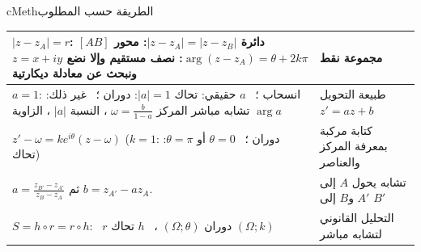 \documentclass[12pt,a4paper]{article}
\newenvironment{BOX}[2]{\begin{otherlanguage}{english}\begin{arbox}{#1}{#2}}{\end{arbox}\end{otherlanguage}}
\begin{document}
\begin{BOX}{cMeth}{الطريقة حسب المطلوب}
\begin{center}
\begin{tabular}{|p{}|p{}|}
$|z-z_A|=r$: دائرة \newline $|z-z_A|=|z-z_B|$: محور $[AB]$ \newline $\arg(z-z_A)=\theta+2k\pi$: نصف مستقيم \newline وإلا نضع $z=x+iy$ ونبحث عن معادلة ديكارتية & مجموعة نقط\\\hline
$a=1$: انسحاب ؛ \ $a$ حقيقي: تحاك \newline $|a|=1$: دوران ؛ \ غير ذلك: تشابه مباشر \newline المركز $\omega=\frac{b}{1-a}$ ، النسبة $|a|$ ، الزاوية $\arg a$ & طبيعة التحويل $z'=az+b$\\\hline
$z'-\omega=ke^{i\theta}(z-\omega)$ \newline ($k=1$: دوران ؛ \ $\theta=0$ أو $\theta=\pi$: تحاك) & كتابة مركبة بمعرفة المركز والعناصر\\\hline
$a=\frac{z_{B'}-z_{A'}}{z_B-z_A}$ ثم $b=z_{A'}-az_A$. & تشابه يحول $A$ إلى $A'$ و$B$ إلى $B'$\\\hline
$S=h\circ r=r\circ h$: \ $r$ دوران $(\Omega;\theta)$ ، \ $h$ تحاك $(\Omega;k)$ & التحليل القانوني لتشابه مباشر\\\hline
\end{tabular}
\end{center}
\end{BOX}
\end{document}
